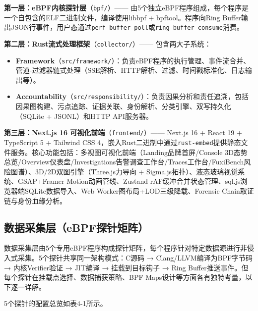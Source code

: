 \documentclass[a4paper]{ctexart}
\makeatletter
\renewcommand{\_}{%
  \ifmmode
    \nfss@text{\textunderscore}%
  \else
    \textunderscore\discretionary{}{}{}%
  \fi}
\makeatother
\begin{document}
\textbf{第一层：eBPF内核探针层}（\texttt{bpf/}）—— 由5个独立eBPF程序组成，每个程序是一个自包含的ELF二进制文件，编译使用libbpf + bpftool。程序向Ring Buffer输出JSON行事件，用户态通过\texttt{perf\_buffer\_\_poll}或\texttt{ring\_buffer\_\_consume}消费。


\textbf{第二层：Rust流式处理框架}（\texttt{collector/}）—— 包含两大子系统：

\begin{itemize}
\item \textbf{Framework}（\texttt{src/framework/}）：负责eBPF程序的执行管理、事件流合并、管道-过滤器链式处理（SSE解析、HTTP解析、过滤、时间戳标准化、日志输出等）。
\item \textbf{Accountability}（\texttt{src/responsibility/}）：负责因果分析和责任追溯，包括因果图构建、污点追踪、证据关联、身份解析、分类引擎、双写持久化（SQLite + JSONL）和HTTP API服务器。
\end{itemize}

\textbf{第三层：Next.js 16 可视化前端}（\texttt{frontend/}）—— Next.js 16 + React 19 + TypeScript 5 + Tailwind CSS 4，嵌入Rust二进制中通过\texttt{rust-embed}提供静态文件服务。核心功能包括：多视图可视化前端（Landing品牌首屏/Console 3D态势总览/Overview仪表盘/Investigations告警调查工作台/Traces工作台/FuxiBench风险图谱）、3D/2D双图引擎（Three.js力导向 + Sigma.js拓扑）、液态玻璃视觉系统、GSAP+Framer Motion动画管线、Zustand rAF缓冲合并状态管理、sql.js浏览器端SQLite数据导入、Web Worker图布局+LOD三级降载、Forensic Chain取证链与身份血缘分析。


\subsection{数据采集层（eBPF探针矩阵）}



数据采集层由5个专用eBPF程序构成探针矩阵，每个程序针对特定数据源进行非侵入式采集。5个探针共享同一架构模式：C源码 → Clang/LLVM编译为BPF字节码 → 内核Verifier验证 → JIT编译 → 挂载到目标钩子 → Ring Buffer推送事件。但每个探针在挂载点选择、数据捕获策略、BPF Maps设计等方面各有独特考量，以下逐一详解。


5个探针的配置总览如表4-1所示。
\end{document}
